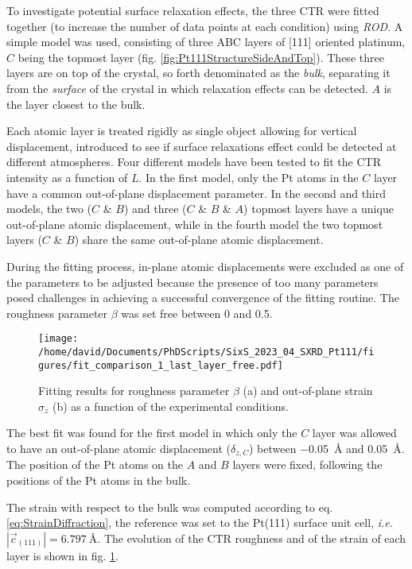 To investigate potential surface relaxation effects, the three CTR were fitted together (to increase the number of data points at each condition) using \textit{ROD}.
A simple model was used, consisting of three ABC layers of [111] oriented platinum, $C$ being the topmost layer (fig. \ref{fig:Pt111StructureSideAndTop}).
These three layers are on top of the crystal, so forth denominated as the \textit{bulk}, separating it from the \textit{surface} of the crystal in which relaxation effects can be detected.
$A$ is the layer closest to the bulk.

Each atomic layer is treated rigidly as single object allowing for vertical displacement, introduced to see if surface relaxations effect could be detected at different atmospheres.
Four different models have been tested to fit the CTR intensity as a function of $L$.
In the first model, only the Pt atoms in the $C$ layer have a common out-of-plane displacement parameter.
In the second and third models, the two ($C$ \& $B$) and three ($C$ \& $B$ \& $A$) topmost layers have a unique out-of-plane atomic displacement, while in the fourth model the two topmost layers ($C$ \& $B$) share the same out-of-plane atomic displacement.

During the fitting process, in-plane atomic displacements were excluded as one of the parameters to be adjusted because the presence of too many parameters posed challenges in achieving a successful convergence of the fitting routine.
The roughness parameter $\beta$ was set free between 0 and 0.5.

\begin{figure}[!htb]
    \centering
    \texttt{[image: /home/david/Documents/PhDScripts/SixS\_2023\_04\_SXRD\_Pt111/figures/fit\_comparison\_1\_last\_layer\_free.pdf]}
    \caption{
        Fitting results for roughness parameter $\beta$ (a) and out-of-plane strain $\sigma_z$ (b) as a function of the experimental conditions.
    }
    \label{fig:CTRFit111}
\end{figure}

The best fit was found for the first model in which only the $C$ layer was allowed to have an out-of-plane atomic displacement ($\delta_{z, C}$) between \qty{-0.05}{\angstrom} and \qty{0.05}{\angstrom}.
The position of the Pt atoms on the $A$ and $B$ layers were fixed, following the positions of the Pt atoms in the bulk.

The strain with respect to the bulk was computed according to eq. \ref{eq:StrainDiffraction}, the reference was set to the Pt(111) surface unit cell, \textit{i.e.} $|\vec{c}_{(111)}| = \qty{6.797}{\angstrom}$.
The evolution of the CTR roughness and of the strain of each layer is shown in fig. \ref{fig:CTRFit111}.

